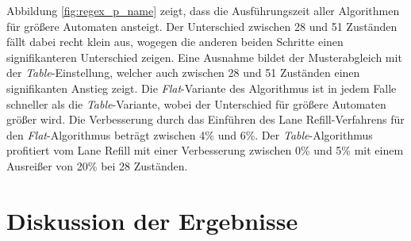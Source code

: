 Abbildung \ref{fig:regex_p_name} zeigt, dass die Ausführungszeit aller Algorithmen für größere Automaten ansteigt.
Der Unterschied zwischen 28 und 51 Zuständen fällt dabei recht klein aus, wogegen die anderen beiden Schritte einen signifikanteren Unterschied zeigen.
Eine Ausnahme bildet der Musterabgleich mit der \emph{Table}-Einstellung, welcher auch zwischen 28 und 51 Zuständen einen signifikanten Anstieg zeigt.
Die \emph{Flat}-Variante des Algorithmus ist in jedem Falle schneller als die \emph{Table}-Variante, wobei der Unterschied für größere Automaten größer wird.
Die Verbesserung durch das Einführen des Lane Refill-Verfahrens für den \emph{Flat}-Algorithmus beträgt zwischen 4\% und 6\%.
Der \emph{Table}-Algorithmus profitiert vom Lane Refill mit einer Verbesserung zwischen 0\% und 5\% mit einem Ausreißer von 20\% bei 28 Zuständen.

\section{Diskussion der Ergebnisse}
